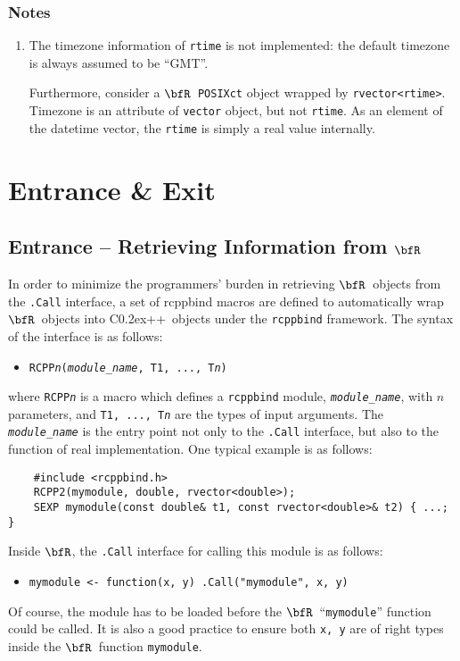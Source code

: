 \documentclass{article}
\def\C++{C{\raise 0.2ex\hbox{++}}}
\newcommand{\R}{$\bfR$}
\begin{document}
\subsubsection*{Notes}
\begin{enumerate}
  \item The timezone information of \texttt{rtime} is not
    implemented: the default timezone is always assumed to be
    ``GMT''.
    
    Furthermore, consider a \R\ \texttt{POSIXct} object
    wrapped by \texttt{rvector<rtime>}. Timezone is an
    attribute of \texttt{vector} object, but not
    \texttt{rtime}. As an element of the datetime vector, the
    \texttt{rtime} is simply a real value internally.
\end{enumerate}

\section{Entrance \& Exit}\label{sec:entrance-exit}

\subsection{Entrance -- Retrieving Information from \R}

In order to minimize the programmers' burden in retrieving
\R\ objects from the \texttt{.Call} interface, a set of
rcppbind macros are defined to automatically wrap \R\ objects
into \C++\ objects under the \texttt{rcppbind} framework.
The syntax of the interface is as follows:
\begin{itemize}
  \item[] \texttt{RCPP\textsl{n}(\textsl{module\_name}, T1, ..., T\textsl{n})}
\end{itemize}
where \texttt{RCPP\textsl{n}} is a macro which defines a
\texttt{rcppbind} module, \texttt{\textsl{module\_name}},
with $n$ parameters, and \texttt{T1, ..., T\textsl{n}} are
the types of input arguments. The
\texttt{\textsl{module\_name}} is the entry point not only to the
\texttt{.Call} interface, but also to the function of real
implementation. One typical example is as follows:
\begin{lstlisting}
    #include <rcppbind.h>
    RCPP2(mymodule, double, rvector<double>);
    SEXP mymodule(const double& t1, const rvector<double>& t2) { ...; }
\end{lstlisting}
Inside \R, the \texttt{.Call} interface for calling this
module is as follows:
\begin{itemize}
  \item[] \texttt{mymodule <- function(x, y) .Call("mymodule", x, y)}
\end{itemize}
Of course, the module has to be loaded before the \R\
``\texttt{mymodule}'' function could be called. It is also a
good practice to ensure both \texttt{x, y} are of right types
inside the \R\ function \texttt{mymodule}.
\end{document}
